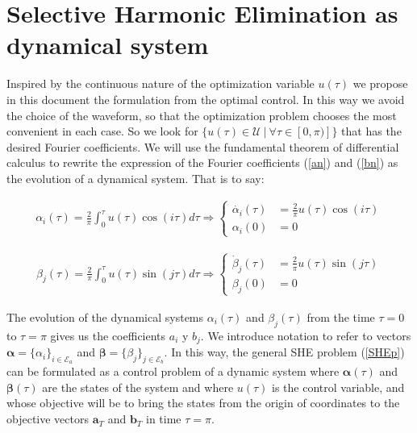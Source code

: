 
\section{Selective Harmonic Elimination as dynamical system}

%


Inspired by the continuous nature of the optimization variable $ u (\tau) $ we propose in this document the formulation from the optimal control. In this way we avoid the choice of the waveform, so that the optimization problem chooses the most convenient in each case. So we look for $ \{u (\tau) \in \mathcal{U} \ | \ \forall \tau \in [0, \pi)] \} $ that has the desired Fourier coefficients.
%
We will use the fundamental theorem of differential calculus to rewrite the expression of the Fourier coefficients (\ref {an}) and (\ref {bn}) as the evolution of a dynamical system. That is to say:

\begin{gather}
    \alpha_i(\tau) = \frac{2}{\pi}\int_0^\tau u(\tau) \cos(i\tau)d\tau 
    \Rightarrow
    \begin{cases} \label{ode}
        \dot{\alpha_i}(\tau) & = \frac{2}{\pi}u(\tau)\cos(i\tau) \\  
        \alpha_i(0) & = 0       
    \end{cases}
\end{gather}

\begin{gather}
    \beta_j(\tau) = \frac{2}{\pi}\int_0^\tau u(\tau) \sin(j\tau)d\tau 
    \Rightarrow
    \begin{cases} \label{ode}
        \dot{\beta}_j(\tau) & = \frac{2}{\pi}u(\tau)\sin(j\tau) \\  
        \beta_j(0) & = 0       
    \end{cases}
\end{gather}

The evolution of the dynamical systems $ \alpha_i (\tau) $ and $ \beta_j (\tau) $ from the time $ \tau = 0 $ to $ \tau = \pi $ gives us the coefficients $ a_i $ y $ b_j $.
%
We introduce notation to refer to vectors $\bm{\alpha} = \{\alpha_i\}_{i\in\mathcal{E}_a}$ and $\bm{\beta} = \{\beta_j\}_{j\in\mathcal{E}_b}$.
%
In this way, the general SHE problem (\ref{SHEp}) can be formulated as a control problem of a dynamic system where $ \bm{\alpha} (\tau) $ and $ \bm{\beta} (\tau ) $ are the states of the system and where $ u (\tau) $ is the control variable, and whose objective will be to bring the states from the origin of coordinates to the objective vectors $ \bm{a} _T $ and $ \bm{b} _T $ in time $ \tau = \pi $.

